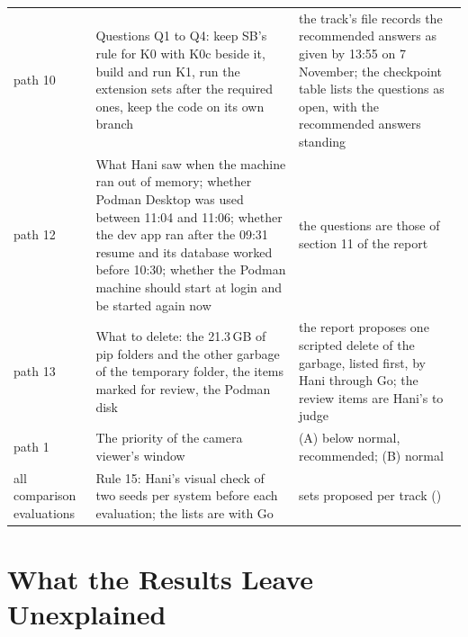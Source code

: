 \begin{small}
\begin{longtable}{@{}P{2.1cm}P{5.9cm}P{6.0cm}@{}}
path 10 &
Questions Q1 to Q4: keep SB's rule for K0 with K0c beside it, build and run K1, run the
extension sets after the required ones, keep the code on its own branch &
the track's file records the recommended answers as given by 13:55 on 7 November; the
checkpoint table lists the questions as open, with the recommended answers standing \\
path 12 &
What Hani saw when the machine ran out of memory; whether Podman Desktop was used
between 11:04 and 11:06; whether the dev app ran after the 09:31 resume and its
database worked before 10:30; whether the Podman machine should start at login and be
started again now &
the questions are those of section 11 of the report \\
path 13 &
What to delete: the 21.3\,GB of pip folders and the other garbage of the temporary
folder, the items marked for review, the Podman disk &
the report proposes one scripted delete of the garbage, listed first, by Hani through
Go; the review items are Hani's to judge \\
path 1 &
The priority of the camera viewer's window &
(A) below normal, recommended; (B) normal \\
all comparison evaluations &
Rule 15: Hani's visual check of two seeds per system before each evaluation; the lists
are with Go &
sets proposed per track () \\
\end{longtable}
\end{small}

\section{What the Results Leave Unexplained}
\label{sec:unexplained}

